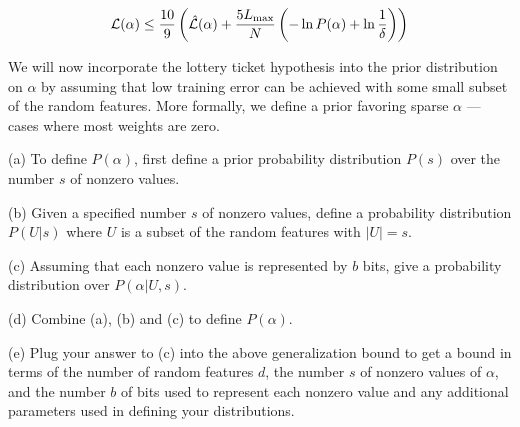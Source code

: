     $${\cal L}(\alpha) \leq \frac{10}{9}\left(\hat{\cal L}(\alpha) + \frac{5L_\mathrm{max}}{N}\left(-\ln P(\alpha) + \ln \frac{1}{\delta}\right)\right)$$

    We will now incorporate the lottery ticket hypothesis into the prior distribution on $\alpha$ by assuming that low training error can be achieved with some small subset of the random features.
    More formally, we define a prior favoring sparse $\alpha$ --- cases where most weights are zero.
    
    \medskip
    (a) To define $P(\alpha)$, first define a prior probability distribution $P(s)$ over the number $s$ of nonzero values.

    
    \medskip
    (b) Given a specified number $s$ of nonzero values, define a probability distribution $P(U|s)$ where $U$ is a subset of the random features with $|U| = s$.

    
    \medskip
    (c) Assuming that each nonzero value is represented by $b$ bits, give a probability distribution over $P(\alpha|U,s)$.

      

    \medskip
    (d) Combine (a), (b) and (c) to define $P(\alpha)$.

      

    \medskip
    (e) Plug your answer to (c) into the above generalization bound to get a bound in terms of the number of random features $d$, the number $s$ of nonzero values of $\alpha$,
    and the number $b$ of bits used to represent each nonzero value and any additional parameters used in defining your distributions.

